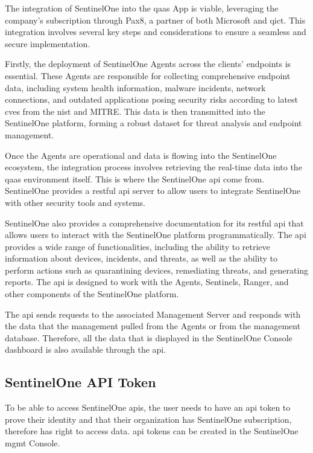 The integration of SentinelOne into the \acrshort{qaas} App is viable, leveraging the company's subscription through Pax8,
a partner of both Microsoft and \acrshort{qict}. This integration involves several key steps and considerations to ensure
a seamless and secure implementation.

Firstly, the deployment of SentinelOne Agents across the clients' endpoints is essential. These Agents are responsible
for collecting comprehensive endpoint data, including system health information, malware incidents, network connections,
and outdated applications posing security risks according to latest \acrshort{cve}s from the \acrshort{nist} and MITRE.
This data is then transmitted into the SentinelOne platform, forming a robust dataset for threat analysis and endpoint
management.

Once the Agents are operational and data is flowing into the SentinelOne ecosystem, the integration process involves
retrieving the real-time data into the \acrshort{qaas} environment itself. This is where the SentinelOne \acrshort{api}
come from. SentinelOne provides a \acrshort{rest}ful \acrshort{api} server to allow users to integrate SentinelOne with other
security tools and systems.

SentinelOne also provides a comprehensive documentation for its \acrshort{rest}ful \acrshort{api} that allows users to interact
with the SentinelOne platform programmatically. The \acrshort{api} provides a wide range of functionalities, including the ability
to retrieve information about devices, incidents, and threats, as well as the ability to perform actions such as quarantining devices,
remediating threats, and generating reports. The \acrshort{api} is designed to work with the Agents, Sentinels, Ranger, and other
components of the SentinelOne platform.

The \acrshort{api} sends requests to the associated Management Server and responds with the data that the management pulled from
the Agents or from the management database. Therefore, all the data that is displayed in the SentinelOne Console dashboard is also
available through the \acrshort{api}.

\subsection{SentinelOne API Token}

To be able to access SentinelOne \acrshort{api}s, the user needs to have an \acrshort{api} token to prove their
identity and that their organization has SentinelOne subscription, therefore has right to access data.
\acrshort{api} tokens can be created in the SentinelOne \acrshort{mgmt} Console.

